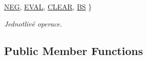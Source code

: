 \begin{DoxyCompactItemize}
\newline
\hyperlink{classteam22_1_1_calc_1_1_lex_a61d29fc4878a3b36d2de2f13c56ed932af8b2b375f8262ba1269fe245d7f19853}{N\+EG}, 
\hyperlink{classteam22_1_1_calc_1_1_lex_a61d29fc4878a3b36d2de2f13c56ed932a3c1443c79523cadf6582f238c04a015f}{E\+V\+AL}, 
\hyperlink{classteam22_1_1_calc_1_1_lex_a61d29fc4878a3b36d2de2f13c56ed932a4281d7ef6ac8dbf79c87603ca20c351c}{C\+L\+E\+AR}, 
\hyperlink{classteam22_1_1_calc_1_1_lex_a61d29fc4878a3b36d2de2f13c56ed932ac62fe9cff8a15f20fb1416612309ae80}{BS}
 \}\begin{DoxyCompactList}\small\item\em Jednotlivé operace. \end{DoxyCompactList}
\end{DoxyCompactItemize}
\subsection*{Public Member Functions}
